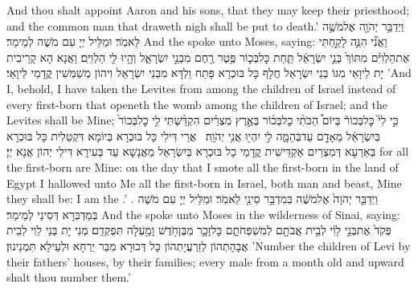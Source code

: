 {And thou shalt appoint Aaron and his sons, that they may keep their priesthood; and the common man that draweth nigh shall be put to death.’}{}
{וַיְדַבֵּ֥ר יְהֹוָ֖ה אֶל\maqqaf מֹשֶׁ֥ה לֵּאמֹֽר׃}
{וּמַלֵּיל יְיָ עִם מֹשֶׁה לְמֵימַר׃}
{And the \lord\space spoke unto Moses, saying:}{}
{וַאֲנִ֞י הִנֵּ֧ה לָקַ֣חְתִּי אֶת\maqqaf הַלְוִיִּ֗ם מִתּוֹךְ֙ בְּנֵ֣י יִשְׂרָאֵ֔ל תַּ֧חַת כׇּל\maqqaf בְּכ֛וֹר פֶּ֥טֶר רֶ֖חֶם מִבְּנֵ֣י יִשְׂרָאֵ֑ל וְהָ֥יוּ לִ֖י הַלְוִיִּֽם׃}
{וַאֲנָא הָא קָרֵיבִית יָת לֵיוָאֵי מִגּוֹ בְּנֵי יִשְׂרָאֵל חֲלָף כָּל בּוּכְרָא פָּתַח וַלְדָּא מִבְּנֵי יִשְׂרָאֵל וִיהוֹן מְשַׁמְּשִׁין קֳדָמַי לֵיוָאֵי׃}
{’And I, behold, I have taken the Levites from among the children of Israel instead of every first-born that openeth the womb among the children of Israel; and the Levites shall be Mine;}{}
{כִּ֣י לִי֮ כׇּל\maqqaf בְּכוֹר֒ בְּיוֹם֩ הַכֹּתִ֨י כׇל\maqqaf בְּכ֜וֹר בְּאֶ֣רֶץ מִצְרַ֗יִם הִקְדַּ֨שְׁתִּי לִ֤י כׇל\maqqaf בְּכוֹר֙ בְּיִשְׂרָאֵ֔ל מֵאָדָ֖ם עַד\maqqaf בְּהֵמָ֑ה לִ֥י יִהְי֖וּ אֲנִ֥י יְהֹוָֽה׃ \petucha }
{אֲרֵי דִּילִי כָּל בּוּכְרָא בְּיוֹמָא דִּקְטַלִית כָּל בּוּכְרָא בְּאַרְעָא דְּמִצְרַיִם אַקְדֵּישִׁית קֳדָמַי כָל בּוּכְרָא בְּיִשְׂרָאֵל מֵאֲנָשָׁא עַד בְּעִירָא דִּילִי יְהוֹן אֲנָא יְיָ׃}
{for all the first-born are Mine: on the day that I smote all the first-born in the land of Egypt I hallowed unto Me all the first-born in Israel, both man and beast, Mine they shall be: I am the \lord.’ .}{}
{וַיְדַבֵּ֤ר יְהֹוָה֙ אֶל\maqqaf מֹשֶׁ֔ה בְּמִדְבַּ֥ר סִינַ֖י לֵאמֹֽר׃}
{וּמַלֵּיל יְיָ עִם מֹשֶׁה בְּמַדְבְּרָא דְּסִינַי לְמֵימַר׃}
{And the \lord\space spoke unto Moses in the wilderness of Sinai, saying:}{}
{פְּקֹד֙ אֶת\maqqaf בְּנֵ֣י לֵוִ֔י לְבֵ֥ית אֲבֹתָ֖ם לְמִשְׁפְּחֹתָ֑ם כׇּל\maqqaf זָכָ֛ר מִבֶּן\maqqaf חֹ֥דֶשׁ וָמַ֖עְלָה תִּפְקְדֵֽם׃}
{מְנִי יָת בְּנֵי לֵוִי לְבֵית אֲבָהָתְהוֹן לְזַרְעֲיָתְהוֹן כָּל דְּכוּרָא מִבַּר יַרְחָא וּלְעֵילָא תִּמְנֵינוּן׃}
{’Number the children of Levi by their fathers’ houses, by their families; every male from a month old and upward shalt thou number them.’}{}
